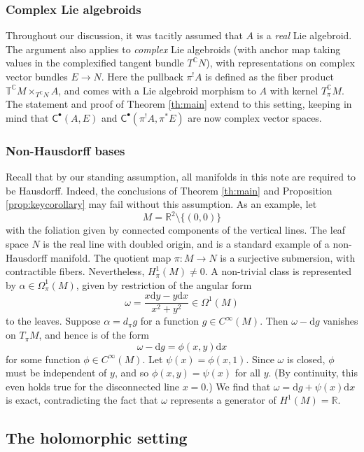\documentclass[11pt]{amsart}
\theoremstyle{definition}
\theoremstyle{remark}
\newcommand{\T}{\mathbb{T}}
\newcommand{\R}{\mathbb{R}}
\newcommand{\C}{\mathbb{C}}
\renewcommand{\d}{{\mbox{d}}}
\newcommand{\CC}{\mathsf{C}}
\begin{document}
 \subsubsection{Complex Lie algebroids} 
 	Throughout our discussion, it was tacitly assumed that $A$ is a \emph{real} Lie algebroid. The argument also applies to \emph{complex} Lie algebroids (with anchor map  taking values in the complexified tangent bundle $T^\C N$), with representations on complex vector bundles $E\to N$. 
 	Here the pullback $\pi^!A$ is defined as the fiber product 
 	$\T^\C M\times_{T^\C N} A$, and comes with a Lie algebroid morphism to $A$ with kernel $T_\pi^\C M$. The statement and proof of Theorem \ref{th:main} extend to this setting, keeping in mind that $\CC^\bullet (A,E)$ and $\CC^\bullet(\pi^!A,\pi^*E)$ are now complex vector spaces. 
 
 
 \subsubsection{Non-Hausdorff bases} 
 Recall that by our standing assumption, all manifolds in this note are required to be Hausdorff. 
 Indeed, the conclusions of Theorem \ref{th:main} and Proposition \ref{prop:keycorollary}
 may fail without this assumption. As an example, let 
 \[
 M=\mathbb R^2\setminus\{(0,0)\}
 \]
 with the foliation given by connected components of the vertical lines. The leaf space $N$ is the real line with doubled origin, and  is a standard example of a non-Hausdorff manifold. The quotient map $\pi\colon M\to N$ is a surjective submersion, with contractible fibers. 
 Nevertheless, $H^1_\pi(M)\neq 0$. A non-trivial class is represented by $\alpha\in \Omega^1_\pi(M)$, given by 
restriction of the angular form 
 \[
 \omega=\frac{x \d y-y\d x}{x^2+y^2}\in\Omega^1(M)
 \]
 to the leaves. Suppose $\alpha=d_\pi g$ for a function $g\in C^\infty(M)$. Then $\omega-\d g$ vanishes on $T_\pi M$, and hence is of the form 
 \[ \omega-\d g=\phi(x,y)\d x\] 
 for some function $\phi\in C^\infty(M)$. Let $\psi(x)=\phi(x,1)$. 
 Since $\omega$ is closed, $\phi$ must be independent of $y$, and so $\phi(x,y)=\psi(x)$ for all $y$. 
 (By continuity, this even holds true for the disconnected line $x=0$.) 
 We find that $\omega=\d g+\psi(x)\d x$ is exact,  contradicting the fact that  $\omega$ represents a generator of $H^1(M)=\R$. 
 
 
 
 
\subsection{The holomorphic setting}
\end{document}
